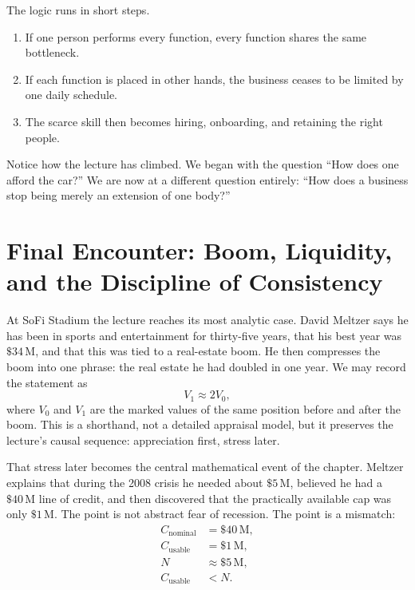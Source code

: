 The logic runs in short steps.
\begin{enumerate}
\item If one person performs every function, every function shares the same bottleneck.
\item If each function is placed in other hands, the business ceases to be limited by one daily schedule.
\item The scarce skill then becomes hiring, onboarding, and retaining the right people.
\end{enumerate}

Notice how the lecture has climbed. We began with the question ``How does one afford the car?'' We are now at a different question entirely: ``How does a business stop being merely an extension of one body?''

\section{Final Encounter: Boom, Liquidity, and the Discipline of Consistency}

At SoFi Stadium the lecture reaches its most analytic case. David Meltzer says he has been in sports and entertainment for thirty-five years, that his best year was \(\$34\,\mathrm{M}\), and that this was tied to a real-estate boom. He then compresses the boom into one phrase: the real estate he had doubled in one year. We may record the statement as
\begin{equation}
V_1 \approx 2V_0,
\end{equation}
where \(V_0\) and \(V_1\) are the marked values of the same position before and after the boom. This is a shorthand, not a detailed appraisal model, but it preserves the lecture's causal sequence: appreciation first, stress later.

That stress later becomes the central mathematical event of the chapter. Meltzer explains that during the 2008 crisis he needed about \(\$5\,\mathrm{M}\), believed he had a \(\$40\,\mathrm{M}\) line of credit, and then discovered that the practically available cap was only \(\$1\,\mathrm{M}\). The point is not abstract fear of recession. The point is a mismatch:
\begin{align}
C_{\mathrm{nominal}} &= \$40\,\mathrm{M},\\
C_{\mathrm{usable}} &= \$1\,\mathrm{M},\\
N &\approx \$5\,\mathrm{M},\\
C_{\mathrm{usable}} &< N.
\end{align}

